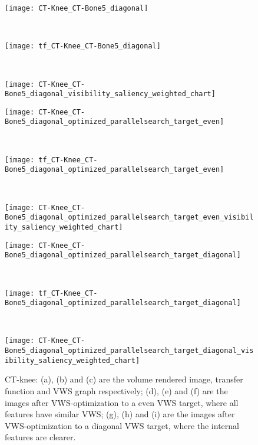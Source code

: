 \begin{figure}
	\centering
	\begin{minipage}{.9\textwidth}%
		\begin{minipage}{.3\textwidth}
			\texttt{[image: CT-Knee\_CT-Bone5\_diagonal]}
			\subcaption{}
		\end{minipage}~
		\begin{minipage}{.3\textwidth}
			\texttt{[image: tf\_CT-Knee\_CT-Bone5\_diagonal]}
			\subcaption{}
		\end{minipage}~
		\begin{minipage}{.4\textwidth}
			\texttt{[image: CT-Knee\_CT-Bone5\_diagonal\_visibility\_saliency\_weighted\_chart]}
			\subcaption{}
		\end{minipage}
		
		\begin{minipage}{.3\textwidth}
			\texttt{[image: CT-Knee\_CT-Bone5\_diagonal\_optimized\_parallelsearch\_target\_even]}
			\subcaption{}
		\end{minipage}~
		\begin{minipage}{.3\textwidth}
			\texttt{[image: tf\_CT-Knee\_CT-Bone5\_diagonal\_optimized\_parallelsearch\_target\_even]}
			\subcaption{}
		\end{minipage}~
		\begin{minipage}{.4\textwidth}
			\texttt{[image: CT-Knee\_CT-Bone5\_diagonal\_optimized\_parallelsearch\_target\_even\_visibility\_saliency\_weighted\_chart]}
			\subcaption{}
		\end{minipage}
		
		\begin{minipage}{.3\textwidth}
			\texttt{[image: CT-Knee\_CT-Bone5\_diagonal\_optimized\_parallelsearch\_target\_diagonal]}
			\subcaption{}
		\end{minipage}~
		\begin{minipage}{.3\textwidth}
			\texttt{[image: tf\_CT-Knee\_CT-Bone5\_diagonal\_optimized\_parallelsearch\_target\_diagonal]}
			\subcaption{}
		\end{minipage}~
		\begin{minipage}{.4\textwidth}
			\texttt{[image: CT-Knee\_CT-Bone5\_diagonal\_optimized\_parallelsearch\_target\_diagonal\_visibility\_saliency\_weighted\_chart]}
			\subcaption{}
		\end{minipage}
	\end{minipage}
	\caption{CT-knee: (a), (b) and (c) are the volume rendered image, transfer function and VWS graph respectively; (d), (e) and (f) are the images after VWS-optimization to a even VWS target, where all features have similar VWS; (g), (h) and (i) are the images after VWS-optimization to a diagonal VWS target, where the internal features are clearer.
	}
	\label{fig:CT-Knee_CT-Bone5_diagonal}
\end{figure}
